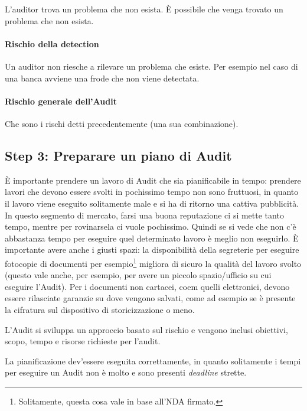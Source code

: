 L'auditor trova un problema che non esista. È possibile che venga trovato un 
problema che non esista.


\paragraph*{Rischio della detection}

Un auditor non riesche a rilevare un problema che esiste. Per esempio nel caso di una banca avviene una frode che non viene detectata.


\paragraph*{Rischio generale dell'Audit}

Che sono i rischi detti precedentemente (una sua combinazione).



\subsection{Step 3: Preparare un piano di Audit}

È importante prendere un lavoro di Audit che sia pianificabile in tempo: 
prendere lavori che devono essere svolti in pochissimo tempo non sono fruttuosi, 
in quanto il lavoro viene eseguito solitamente male e si ha di ritorno una 
cattiva pubblicità. In questo segmento di mercato, farsi una buona reputazione 
ci si mette tanto tempo, mentre per rovinarsela ci vuole pochissimo. Quindi se 
si vede che non c'è abbastanza tempo per eseguire quel determinato lavoro è 
meglio non eseguirlo. 
È importante avere anche i giusti spazi: la disponibilità della segreterie per 
eseguire fotocopie di documenti per esempio\footnote{Solitamente, questa cosa 
vale in base all'NDA firmato.} migliora di sicuro la qualità del lavoro svolto 
(questo vale anche, per esempio, per avere un piccolo spazio/ufficio su cui 
eseguire l'Audit). Per i documenti non cartacei, coem quelli elettronici, devono 
essere rilasciate garanzie su dove vengono salvati, come ad esempio se è 
presente la cifratura sul dispositivo di storicizzazione o meno.

L'Audit si sviluppa un approccio basato sul rischio e vengono inclusi obiettivi, 
scopo, tempo e risorse richieste per l'audit.

La pianificazione dev'essere eseguita correttamente, in quanto solitamente i 
tempi per eseguire un Audit non è molto e sono presenti \textit{deadline} 
strette.





